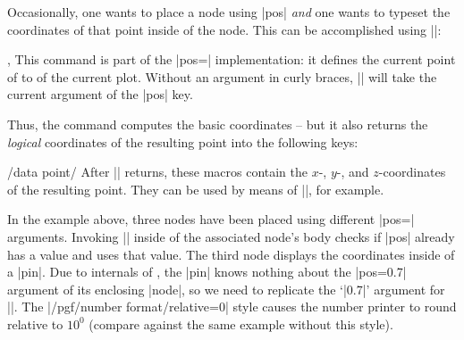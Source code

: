 {Occasionally, one wants to place a node using |pos| \emph{and} one wants to
typeset the coordinates of that point inside of the node. This can be
accomplished using |\pgfplotspointplotattime|:

\begin{commandlist}{\pgfplotspointplotattime,\pgfplotspointplotattime{}}
    This command is part of the |pos=| implementation: it
    defines the current point of \pgfname{} to  of the current
    plot. Without an argument in curly braces, |\pgfplotspointplotattime| will
    take the current argument of the |pos| key.

    Thus, the command computes the basic \pgfname{} coordinates -- but it also
    returns the \emph{logical} coordinates of the resulting point into the
    following keys:

    \begin{pgfplotsxykeylist}{/data point/\x}
        After |\pgfplotspointplotattime| returns, these macros contain the $x$-,
        $y$-, and $z$-coordinates of the resulting point. They can be used by
        means of ||, for example.
\begin{codeexample}[]
\end{codeexample}

        In the example above, three nodes have been placed using different
        |pos=| arguments. Invoking |\pgfplotspointplotattime| inside of the
        associated node's body checks if |pos| already has a value and uses
        that value. The third node displays the coordinates inside of a |pin|.
        Due to internals of \tikzname, the |pin| knows nothing about the
        |pos=0.7| argument of its enclosing |node|, so we need to replicate the
        `|0.7|' argument for ||. The
        |/pgf/number format/relative=0| style causes the number printer to
        round relative to $10^0$ (compare against the same example without this
        style).


\end{pgfplotsxykeylist}
\end{commandlist}}
